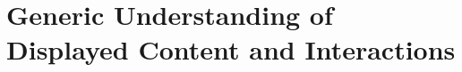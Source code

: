\chapter{Generic Understanding of Displayed Content and Interactions}\label{chap:muifold}
















